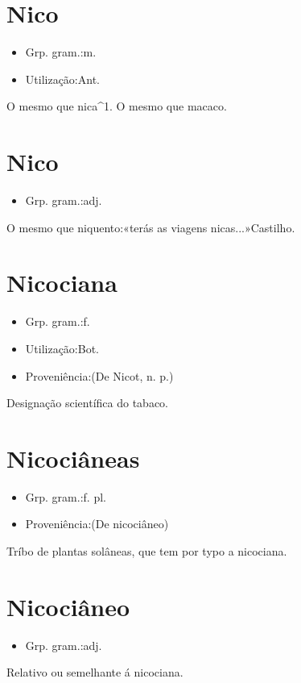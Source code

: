 \section{Nico}
\begin{itemize}
\item {Grp. gram.:m.}
\end{itemize}
\begin{itemize}
\item {Utilização:Ant.}
\end{itemize}
O mesmo que \textunderscore nica\textunderscore ^1.
O mesmo que \textunderscore macaco\textunderscore .
\section{Nico}
\begin{itemize}
\item {Grp. gram.:adj.}
\end{itemize}
O mesmo que \textunderscore niquento\textunderscore :«\textunderscore terás as viagens nicas...\textunderscore »Castilho.
\section{Nicociana}
\begin{itemize}
\item {Grp. gram.:f.}
\end{itemize}
\begin{itemize}
\item {Utilização:Bot.}
\end{itemize}
\begin{itemize}
\item {Proveniência:(De \textunderscore Nicot\textunderscore , n. p.)}
\end{itemize}
Designação scientífica do tabaco.
\section{Nicociâneas}
\begin{itemize}
\item {Grp. gram.:f. pl.}
\end{itemize}
\begin{itemize}
\item {Proveniência:(De \textunderscore nicociâneo\textunderscore )}
\end{itemize}
Tríbo de plantas solâneas, que tem por typo a nicociana.
\section{Nicociâneo}
\begin{itemize}
\item {Grp. gram.:adj.}
\end{itemize}
Relativo ou semelhante á nicociana.
